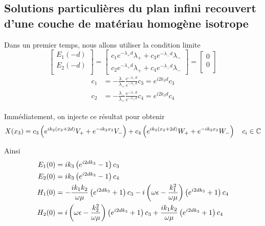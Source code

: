 \subsection{Solutions particulières du plan infini recouvert d'une couche de matériau homogène isotrope}


Dans un premier temps, nous allons utiliser la condition limite 
\begin{equation}
    \begin{bmatrix}
        E_1(-d)\\
        E_2(-d)\\
    \end{bmatrix}
    =
    \begin{bmatrix}
        c_1 e^{-\lambda_+ d} \lambda_{+} + c_3 e^{-\lambda_- d} \lambda_{-} \\
        c_2 e^{-\lambda_+ d} \lambda_{+} + c_4 e^{-\lambda_- d} \lambda_{-}
    \end{bmatrix}
    =
    \begin{bmatrix}
        0\\
        0\\
    \end{bmatrix}
\end{equation}
\begin{align}
    c_1 &= -\frac{\lambda_-}{\lambda_+}\frac{e^{-\lambda_-d}}{e^{-\lambda_+d}}c_3 = e^{i2k_3d}c_3\\
    c_2 &= -\frac{\lambda_-}{\lambda_+}\frac{e^{-\lambda_-d}}{e^{-\lambda_+d}}c_4 = e^{i2k_3d}c_4
\end{align}


Immédiatement, on injecte ce résultat pour obtenir
\begin{equation}
    X(x_3) = c_3\left(e^{ik_3(x_3 + 2d)}V_+ + e^{-ik_3x_3}V_- \right)  + c_4\left(e^{ik_3(x_3 + 2d)}W_+ + e^{-ik_3 x_3}W_- \right) \quad c_i \in \mathbb C
\end{equation}

Ainsi
\begin{align}
     E_1(0) &= ik_3\left(e^{i2dk_3} - 1\right)c_3 \\
     E_2(0) &= ik_3\left(e^{i2dk_3} - 1\right)c_4 \\
     H_1(0) &= 
        -\dfrac{ik_1k_2}{\omega\mu}\left(e^{i2dk_3} + 1\right)c_3 
        - i\left(\omega\epsilon-\dfrac{k_1^2}{\omega\mu}\right)\left( e^{i2dk_3} + 1 \right)c_4 \\
     H_2(0) &=
         i\left(\omega\epsilon-\dfrac{k_2^2}{\omega\mu}\right)\left( e^{i2dk_3} + 1 \right)c_3
        + \dfrac{ik_1k_2}{\omega\mu}\left(e^{i2dk_3} + 1\right)c_4
\end{align}

